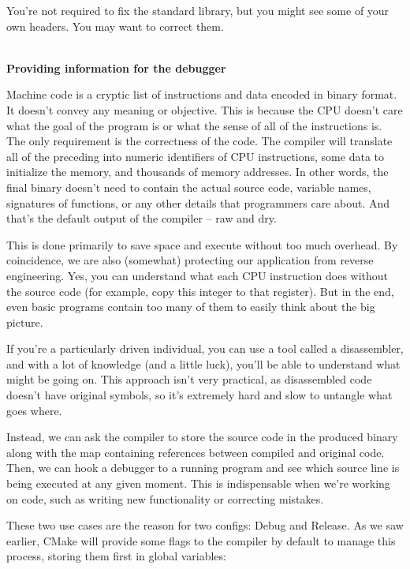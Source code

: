 You're not required to fix the standard library, but you might see some of your own headers. You may want to correct them.

\hspace*{\fill} \\ %
\noindent
\textbf{Providing information for the debugger}

Machine code is a cryptic list of instructions and data encoded in binary format. It doesn't convey any meaning or objective. This is because the CPU doesn't care what the goal of the program is or what the sense of all of the instructions is. The only requirement is the correctness of the code. The compiler will translate all of the preceding into numeric identifiers of CPU instructions, some data to initialize the memory, and thousands of memory addresses. In other words, the final binary doesn't need to contain the actual source code, variable names, signatures of functions, or any other details that programmers care about. And that's the default output of the compiler – raw and dry.

This is done primarily to save space and execute without too much overhead. By coincidence, we are also (somewhat) protecting our application from reverse engineering. Yes, you can understand what each CPU instruction does without the source code (for example, copy this integer to that register). But in the end, even basic programs contain too many of them to easily think about the big picture.

If you're a particularly driven individual, you can use a tool called a disassembler, and with a lot of knowledge (and a little luck), you'll be able to understand what might be going on. This approach isn't very practical, as disassembled code doesn't have original symbols, so it's extremely hard and slow to untangle what goes where.

Instead, we can ask the compiler to store the source code in the produced binary along with the map containing references between compiled and original code. Then, we can hook a debugger to a running program and see which source line is being executed at any given moment. This is indispensable when we're working on code, such as writing new functionality or correcting mistakes.

These two use cases are the reason for two configs: Debug and Release. As we saw earlier, CMake will provide some flags to the compiler by default to manage this process, storing them first in global variables:

